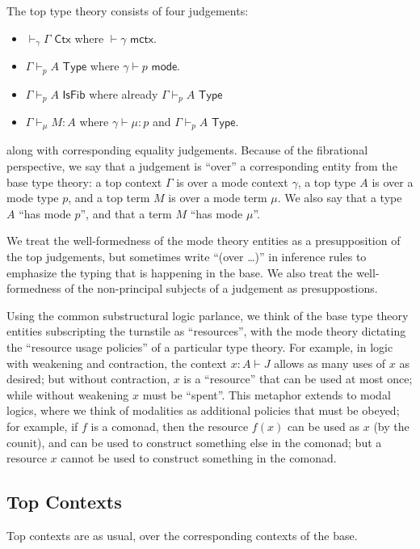\documentclass[10pt]{article}
\theoremstyle{definition}
\newcommand{\yields}{\vdash}
\newcommand{\CTX}{\,\,\mathsf{Ctx}}
\newcommand{\ctx}{\,\,\mathsf{mctx}}
\newcommand{\TYPE}{\,\,\mathsf{Type}}
\newcommand{\type}{\,\,\mathsf{mode}}
\newcommand{\ISFIB}{\,\,\mathsf{IsFib}}
\begin{document}
The top type theory consists of four judgements: 
\begin{itemize}
\item $\yields_\gamma \Gamma \CTX$ where $\yields \gamma \ctx$.
\item $\Gamma \yields_p A \TYPE$ where $\gamma \yields p \type$.
\item $\Gamma \yields_p A \ISFIB$ where already $\Gamma \yields_p A \TYPE$
\item $\Gamma \yields_\mu M : A$ where $\gamma \yields \mu : p$ and
  $\Gamma \yields_p A \TYPE$.
\end{itemize}
along with corresponding equality judgements.  Because of the
fibrational perspective, we say that a judgement is ``over'' a
corresponding entity from the base type theory: a top context $\Gamma$
is over a mode context $\gamma$, a top type $A$ is over a mode type $p$,
and a top term $M$ is over a mode term $\mu$.  We also say that a type $A$
``has mode $p$'', and that a term $M$ ``has mode $\mu$''. 

We treat the well-formedness of the mode theory entities as a
presupposition of the top judgements, but sometimes write ``(over
\ldots)'' in inference rules to emphasize the typing that is happening
in the base.  We also treat the well-formedness of the non-principal
subjects of a judgement as presuppostions.

Using the common substructural logic parlance, we think of the base type
theory entities subscripting the turnstile as ``resources'', with the
mode theory dictating the ``resource usage policies'' of a particular
type theory.  For example, in logic with weakening and contraction, the
context $x : A \vdash J$ allows as many uses of $x$ as desired; but
without contraction, $x$ is a ``resource'' that can be used at most
once; while without weakening $x$ must be ``spent''.  This metaphor
extends to modal logics, where we think of modalities as additional
policies that must be obeyed; for example, if $f$ is a comonad, then the
resource $f(x)$ can be used as $x$ (by the counit), and can be used to
construct something else in the comonad; but a resource $x$ cannot be
used to construct something in the comonad.

\subsection{Top Contexts}

Top contexts are as usual, over the corresponding contexts of the base.  
\end{document}
